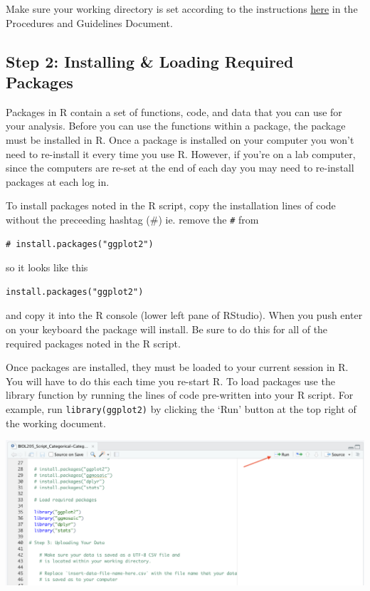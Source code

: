 \documentclass[
]{book}
\begin{document}
Make sure your working directory is set according to the instructions \href{https://ubco-biology.github.io/Procedures-and-Guidelines/set-a-working-directory-in-rstudio.html}{here} in the Procedures and Guidelines Document.

\hypertarget{step-2-installing-loading-required-packages}{%
\subsection*{Step 2: Installing \& Loading Required Packages}\label{step-2-installing-loading-required-packages}}

Packages in R contain a set of functions, code, and data that you can use for your analysis. Before you can use the functions within a package, the package must be installed in R. Once a package is installed on your computer you won't need to re-install it every time you use R. However, if you're on a lab computer, since the computers are re-set at the end of each day you may need to re-install packages at each log in.

To install packages noted in the R script, copy the installation lines of code without the preceeding hashtag (\#) ie. remove the \texttt{\#} from

\begin{verbatim}
# install.packages("ggplot2")
\end{verbatim}

so it looks like this

\begin{verbatim}
install.packages("ggplot2")
\end{verbatim}

and copy it into the R console (lower left pane of RStudio). When you push enter on your keyboard the package will install. Be sure to do this for all of the required packages noted in the R script.

Once packages are installed, they must be loaded to your current session in R. You will have to do this each time you re-start R. To load packages use the library function by running the lines of code pre-written into your R script. For example, run \texttt{library(ggplot2)} by clicking the `Run' button at the top right of the working document.

\includegraphics{images/run_button.png}
\end{document}
